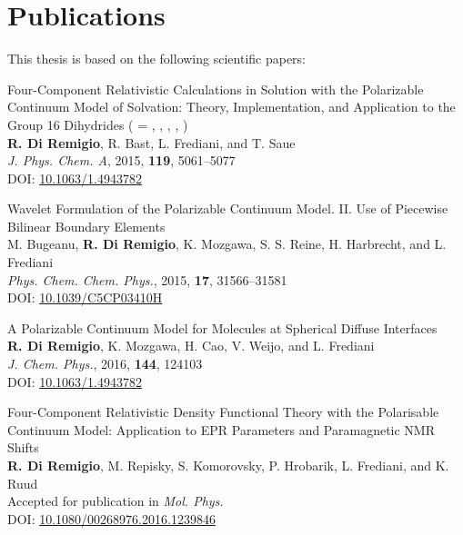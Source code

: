 \thispagestyle{empty}
{}

\chapter*{Publications}

This thesis is based on the following scientific papers:

\renewcommand{\descriptionlabel}[1]{\hspace*{\labelsep}#1}
\begin{description}[leftmargin=2mm, style=nextline]
\item[\paper{I}]
  {\small\textsf{
  Four-Component Relativistic Calculations in Solution with the
  Polarizable Continuum Model of Solvation: Theory,
  Implementation, and Application to the Group 16 Dihydrides
   ( = , , , ,
  )
  }
  \\
  \textbf{R. Di Remigio}, R. Bast, L. Frediani, and T. Saue
  \\
\textit{J. Phys. Chem. A}, \textrm{2015}, \textbf{119}, 5061--5077
  \\
  DOI: \url{10.1063/1.4943782}
  }
\label{relapcm}

\item[\paper{II}]
  {\small\textsf{
  Wavelet Formulation of the Polarizable Continuum Model. II. Use of
  Piecewise Bilinear Boundary Elements
  }
  \\
  M. Bugeanu, \textbf{R. Di Remigio}, K. Mozgawa, S. S. Reine, H.
  Harbrecht,  and L. Frediani
  \\
  \textit{Phys. Chem. Chem. Phys.}, \textrm{2015}, \textbf{17},
  31566--31581
  \\
  DOI: \url{10.1039/C5CP03410H}
  }
\label{wemlin}

\item[\paper{III}]
  \small{\textsf{
  A Polarizable Continuum Model for Molecules at Spherical
  Diffuse Interfaces
  }
  \\
  \textbf{R. Di Remigio}, K. Mozgawa, H. Cao, V. Weijo, and L.
  Frediani
  \\
  \textit{J. Chem. Phys.}, \textrm{2016}, \textbf{144}, 124103
  \\
  DOI: \url{10.1063/1.4943782}
  }
\label{spherical}

\item[\paper{IV}]
  \small{\textsf{
  Four-Component Relativistic Density Functional Theory with the
  Polarisable Continuum Model: Application to EPR Parameters
  and Paramagnetic NMR Shifts
  }
  \\
  \textbf{R. Di Remigio}, M. Repisky, S. Komorovsky, P. Hrobarik, L.
  Frediani, and K. Ruud
  \\
  Accepted for publication in \textit{Mol. Phys.}
  \\
  DOI: \url{10.1080/00268976.2016.1239846}
  }
\label{pcmepr}


\end{description}
